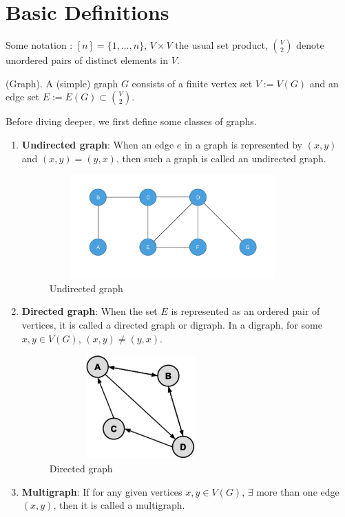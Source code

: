 \chapter{Basic Definitions}
Some notation : $[n] = \{1,\ldots,n\}$, $V \times V$ the usual set product, $\binom{V}{2}$ denote unordered pairs of distinct elements in $V$. 
%
\begin{defn}(Graph).  
A (simple) graph $G$ consists of a finite vertex set $V := V(G)$ and an edge set $E := E(G) \subset \binom{V}{2}.$  
\end{defn}
Before diving deeper, we first define some classes of graphs.
\begin{enumerate}
    \item \textbf{Undirected graph}: When an edge $e$ in a graph is represented by $(x,y)$ and $(x,y)=(y,x)$, then such a graph is called an undirected graph.
    \begin{figure}[hbt!]
        \centering
	\includegraphics[height=4cm,width=9.5cm]{images/undirected.png}
	\caption{Undirected graph}
    \end{figure}
    \item \textbf{Directed graph}: When the set $E$ is represented as an ordered pair of vertices, it is called a directed graph or digraph. In a digraph, for some $x,y \in V(G)$, $(x,y) \neq (y,x)$.
    \begin{figure}[hbt!]
        \centering
	\includegraphics[height=4cm,width=7cm]{images/directed.png}
	\caption{Directed graph}
    \end{figure}
    \item \textbf{Multigraph}: If for any given vertices $x,y \in V(G)$, $\exists$ more than one edge $(x,y)$, then it is called a multigraph.

\end{enumerate}
